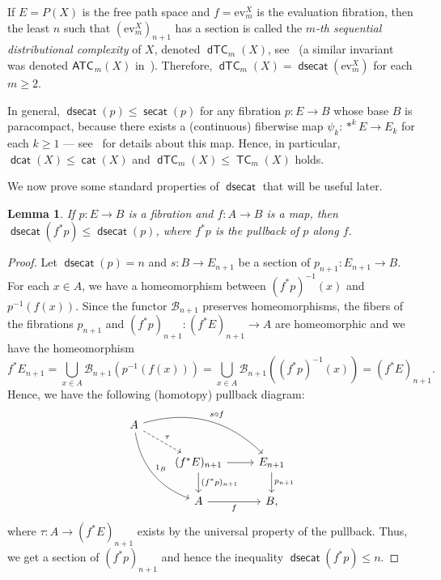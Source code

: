 \documentclass[amscd,amssymb,verbatim,11pt]{amsart}
\theoremstyle{plain}
\newtheorem{lemma}[thm]{Lemma}
\theoremstyle{definition}
\DeclareMathOperator{\cat}{{\mathsf{cat}}}
\DeclareMathOperator{\TC}{{\mathsf{TC}}}
\DeclareMathOperator{\secat}{{\mathsf{secat}}}
\DeclareMathOperator{\dsecat}{{\mathsf{dsecat}}}
\DeclareMathOperator{\dcat}{{\mathsf{dcat}}}
\DeclareMathOperator{\dTC}{{\mathsf{dTC}}}
\def\scr{\mathcal}
\def\B{{\scr B}}
\begin{document}
If $E=P(X)$ is the free path space and $f=\text{ev}_m^X$ is the evaluation fibration, then the least $n$ such that $(\text{ev}^X_m)_{n+1}
$ has a section is called the $m$\emph{-th sequential distributional complexity} of $X$, denoted $\dTC_m(X)$, see~\cite{DJ,Ja1} (a similar invariant was denoted $\sf{{ATC}}$$_m(X)$ in~\cite{KW}). Therefore, $\dTC_m(X)=\dsecat(\text{ev}^X_m)$ for each $m\ge 2$.

In general, $\dsecat(p)\le\secat(p)$ for any fibration $p\colon E\to B$ whose base $B$ is paracompact, because there exists a (continuous) fiberwise map $\psi_k\colon \ast^k E\to E_k$ for each $k\ge 1$ --- see~\cite{KK,Ja1,KW2} for details about this map. Hence, in particular, $\dcat(X)\le\cat(X)$ and $\dTC_m(X)\le\TC_m(X)$ holds.

We now prove some standard properties of $\dsecat$ that will be useful later.
\begin{lemma}\label{lem:dsecat1}
    If $p:E\to B$ is a fibration and $f:A\to B$ is a map, then $\dsecat(f^*p)\le\dsecat(p)$, where $f^*p$ is the pullback of $p$ along $f$.
\end{lemma}

\begin{proof}
    Let $\dsecat(p)=n$ and $s:B\to E_{n+1}$ be a section of $p_{n+1}:E_{n+1}\to B$. For each $x\in A$, we have a homeomorphism between $(f^*p)^{-1}(x)$ and $p^{-1}(f(x))$.
    Since the functor $\B_{n+1}$ preserves homeomorphisms, the fibers of the fibrations $p_{n+1}$ and $(f^*p)_{n+1}:(f^*E)_{n+1}\to A$ are homeomorphic and we have the homeomorphism
    \[
    f^*E_{n+1}=\bigcup_{x\in A} \B_{n+1}\left(p^{-1}(f(x))\right)=\bigcup_{x\in A} \B_{n+1}\left((f^*p)^{-1}(x)\right)=(f^*E)_{n+1}.
    \]
    Hence, we have the following (homotopy) pullback diagram:
    \[\begin{tikzcd}
     A\arrow[ddr, bend right, "1_B"] \arrow[drr, bend left, "s\circ f"] \arrow[dr, dashed, "\tau"] \\
 &
    (f^*E)_{n+1} \arrow{r} \arrow{d}{(f^*p)_{n+1}} & E_{n+1} \arrow[d, "p_{n+1}"] \\
    & A \arrow[swap]{r}{f}                  & B,
    \end{tikzcd}\]
    where $\tau:A\to (f^*E)_{n+1}$ exists by the universal property of the pullback. Thus, we get a section of $(f^*p)_{n+1}$ and hence the inequality $\dsecat(f^*p)\le n$.
\end{proof}
\end{document}
